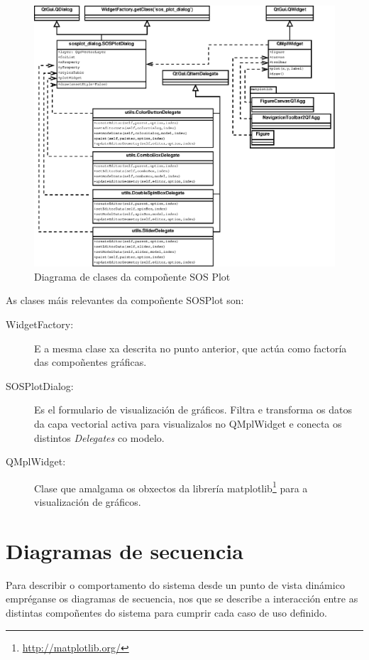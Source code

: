 \begin{figure}
 \centering
 \includegraphics[width=\textwidth]{images/clases_sos_plot.eps}
 \caption{Diagrama de clases da compoñente SOS Plot}
 \label{fig:diaClassSOSPlot}
\end{figure}

As clases máis relevantes da compoñente SOSPlot son:
\begin{description}
\item[WidgetFactory:] E a mesma clase xa descrita no punto anterior, que actúa como factoría das compoñentes gráficas.
\item[SOSPlotDialog:] Es el formulario de visualización de gráficos. Filtra e transforma os datos da capa vectorial activa para visualizalos no QMplWidget e conecta os distintos \emph{Delegates} co modelo.
\item[QMplWidget:] Clase que amalgama os obxectos da librería matplotlib\footnote{\url{http://matplotlib.org/}} para a visualización de gráficos.
\end{description}

\section{Diagramas de secuencia}
Para describir o comportamento do sistema desde un punto de vista dinámico empréganse os diagramas de secuencia, nos que se describe a interacción entre as distintas compoñentes do sistema para cumprir cada caso de uso definido.

